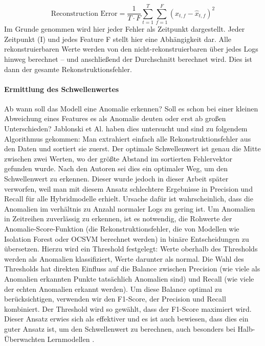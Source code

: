 \documentclass[a4paper,12pt]{article}
\begin{document}
	\[
	\text{Reconstruction Error} = \frac{1}{T \cdot F} \sum_{t=1}^{T} \sum_{f=1}^{F} \left( x_{t,f} - \hat{x}_{t,f} \right)^2
	\]
	Im Grunde genommen wird hier jeder Fehler als Zeitpunkt dargestellt. Jeder Zeitpunkt (I) und jedes Feature F stellt hier eine Abhängigkeit dar. Alle rekonstruierbaren Werte werden von den nicht-rekonstruierbaren über jedes Logs hinweg berechnet – und anschließend der Durchschnitt berechnet wird. Dies ist dann der gesamte Rekonstruktionsfehler.
	
	\paragraph{Ermittlung des Schwellenwertes}
	Ab wann soll das Modell eine Anomalie erkennen? Soll es schon bei einer kleinen Abweichung eines Features es als Anomalie deuten oder erst ab großen Unterschieden? Jablonski et Al. \cite{jablonski2023automatic} haben dies untersucht und sind zu folgendem Algorithmus gekommen:
	Man extrahiert einfach alle Rekonstruktionsfehler aus den Daten und sortiert sie zuerst. Der optimale Schwellenwert ist genau die Mitte zwischen zwei Werten, wo der größte Abstand im sortierten Fehlervektor gefunden wurde.
	Nach den Autoren sei dies ein optimaler Weg, um den Schwellenwert zu erkennen. Dieser wurde jedoch in dieser Arbeit später verworfen, weil man mit diesem Ansatz schlechtere Ergebnisse in Precision und Recall für alle Hybridmodelle erhielt. Ursache dafür ist wahrscheinlich, dass die Anomalien im verhältnis zu Anzahl normaler Logs zu gering ist. Um Anomalien in Zeitreihen zuverlässig zu erkennen, ist es notwendig, die Rohwerte der Anomalie-Score-Funktion (die Rekonstruktionsfehler, die von Modellen wie Isolation Forest oder OCSVM berechnet werden) in binäre Entscheidungen zu übersetzen. Hierzu wird ein Threshold festgelegt: Werte oberhalb des Thresholds werden als Anomalien klassifiziert, Werte darunter als normal. Die Wahl des Thresholds hat direkten Einfluss auf die Balance zwischen Precision (wie viele als Anomalien erkannten Punkte tatsächlich Anomalien sind) und Recall (wie viele der echten Anomalien erkannt werden). Um diese Balance optimal zu berücksichtigen, verwenden wir den F1-Score, der Precision und Recall kombiniert. Der Threshold wird so gewählt, dass der F1-Score maximiert wird. Dieser Ansatz erwies sich als effektiver und es ist auch bewiesen, dass dies ein guter Ansatz ist, um den Schwellenwert zu berechnen, auch besonders bei Halb-Überwachten Lernmodellen \cite{wilkinghoff2024f1ev}.
	
\end{document}
